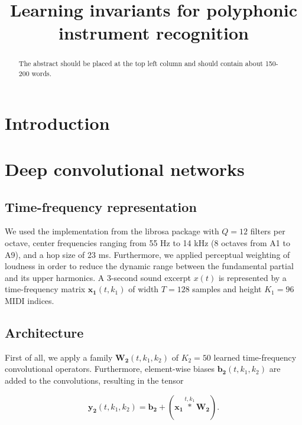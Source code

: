 \documentclass{article}
\title{Learning invariants for polyphonic instrument recognition}
\begin{document}
%
\maketitle
%
\begin{abstract}
The abstract should be placed at the top left column and should contain about 150-200 words.
\end{abstract}
%

\section{Introduction}\label{sec:introduction}


\section{Deep convolutional networks}
\subsection{Time-frequency representation}
We used the implementation from the librosa package \cite{McFee2015} with $Q=12$ filters per octave, center frequencies ranging from 55 Hz to 14 kHz (8 octaves from A1 to A9), and a hop size of 23 ms. Furthermore, we applied perceptual weighting of loudness in order to reduce the dynamic range between the fundamental partial and its upper harmonics. A 3-second sound excerpt $x(t)$ is represented by a time-frequency matrix $\boldsymbol{x_1}(t,k_1)$ of width $T=128$ samples and height $K_1=96$ MIDI indices.

\subsection{Architecture}
First of all, we apply a family $\boldsymbol{W_2}(t,k_1,k_2)$ of $K_2=50$ learned time-frequency convolutional operators.
Furthermore, element-wise biases $\boldsymbol{b_2}(t,k_1,k_2)$ are added to the convolutions, resulting in the tensor 

\begin{equation}
\boldsymbol{y_2}(t,k_1,k_2) =
\boldsymbol{b_2} + 
(\boldsymbol{x_1}
\overset{t,k_1}{\ast}
\boldsymbol{W_2}).
\end{equation}
 
\end{document}
